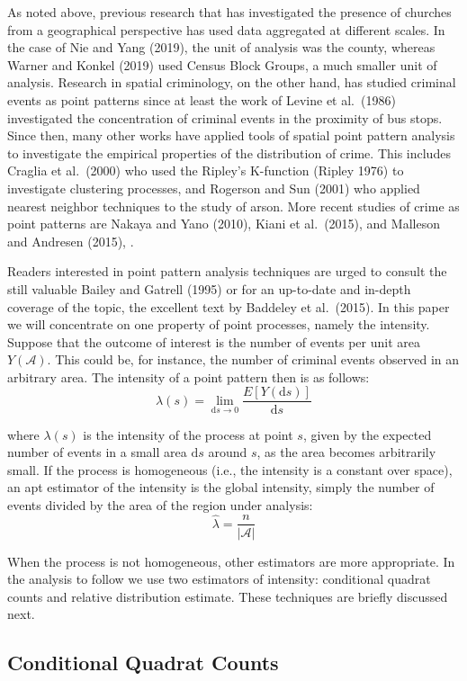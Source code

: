 \documentclass[smallextended]{svjour3}       %
\begin{document}
As noted above, previous research that has investigated the presence of
churches from a geographical perspective has used data aggregated at
different scales. In the case of Nie and Yang (2019), the unit of
analysis was the county, whereas Warner and Konkel (2019) used Census
Block Groups, a much smaller unit of analysis. Research in spatial
criminology, on the other hand, has studied criminal events as point
patterns since at least the work of Levine et al.~(1986) investigated
the concentration of criminal events in the proximity of bus stops.
Since then, many other works have applied tools of spatial point pattern
analysis to investigate the empirical properties of the distribution of
crime. This includes Craglia et al.~(2000) who used the Ripley's
K-function (Ripley 1976) to investigate clustering processes, and
Rogerson and Sun (2001) who applied nearest neighbor techniques to the
study of arson. More recent studies of crime as point patterns are
Nakaya and Yano (2010), Kiani et al.~(2015), and Malleson and Andresen
(2015), .

Readers interested in point pattern analysis techniques are urged to
consult the still valuable Bailey and Gatrell (1995) or for an
up-to-date and in-depth coverage of the topic, the excellent text by
Baddeley et al.~(2015). In this paper we will concentrate on one
property of point processes, namely the intensity. Suppose that the
outcome of interest is the number of events per unit area
\(Y(\mathcal{A})\). This could be, for instance, the number of criminal
events observed in an arbitrary area. The intensity of a point pattern
then is as follows: \[
\lambda(s)=\lim_{\text{d}s \to 0}\frac{E[Y(\text{d}s)]}{\text{d}s}
\]

\noindent where \(\lambda(s)\) is the intensity of the process at point
\(s\), given by the expected number of events in a small area
\(\text{d}s\) around \(s\), as the area becomes arbitrarily small. If
the process is homogeneous (i.e., the intensity is a constant over
space), an apt estimator of the intensity is the global intensity,
simply the number of events divided by the area of the region under
analysis: \[
\hat{\lambda} = \frac{n}{|\mathcal{A}|}
\]

When the process is not homogeneous, other estimators are more
appropriate. In the analysis to follow we use two estimators of
intensity: conditional quadrat counts and relative distribution
estimate. These techniques are briefly discussed next.

\hypertarget{conditional-quadrat-counts}{%
\subsection{Conditional Quadrat
Counts}\label{conditional-quadrat-counts}}
\end{document}
